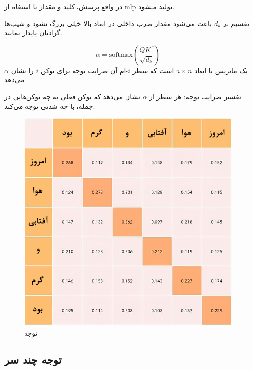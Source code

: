 در واقع پرسش، کلید و مقدار با استفاه از mlp  تولید میشود.



تقسیم بر \( d_k \) باعث می‌شود مقدار ضرب داخلی در ابعاد بالا خیلی بزرگ نشود و شیب‌ها گرادیان پایدار بمانند.

\begin{equation}
	\alpha = \text{softmax}\left( \frac{QK^T}{\sqrt{d_k}} \right)
	\label{eq:alpha}
\end{equation}
\(\alpha\) یک ماتریس با ابعاد \( n \times n \) است که سطر \( i \)-ام آن ضرایب توجه برای توکن \( i \) را نشان می‌دهد.

تفسیر ضرایب توجه: هر سطر از \( \alpha \) نشان می‌دهد که توکن فعلی به چه توکن‌هایی در جمله، با چه شدتی توجه می‌کند.



\begin{figure}[h]
	\centering
	\begin{minipage}[b]{0.6\textwidth}
		\centering
		\includegraphics[width=\textwidth]{transformer_images/persian images/persian_images/b18.png}
		\caption{توجه}
		\label{fig:attention}
	\end{minipage}
	\hfill
	
\end{figure}



\subsection{توجه چند سر}



